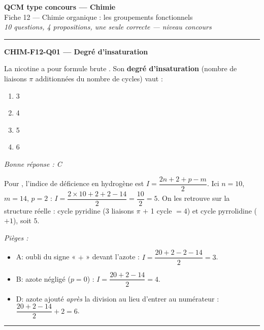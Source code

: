 \documentclass[11pt,a4paper]{article}
\begin{document}
\begin{center}
{\Large\bfseries QCM type concours --- Chimie}\\[2pt]
{\large Fiche 12 --- Chimie organique : les groupements fonctionnels}\\[2pt]
{\itshape 10 questions, 4 propositions, une seule correcte --- niveau concours}
\end{center}
\vspace{6pt}\hrule\vspace{10pt}

\noindent\textbf{CHIM-F12-Q01 --- Degré d'insaturation}\par
La nicotine a pour formule brute . Son \textbf{degré d'insaturation} (nombre de liaisons $\pi$ additionnées du nombre de cycles) vaut :
\begin{enumerate}[label=\Alph*)]
\item \num{3}
\item \num{4}
\item \num{5}
\item \num{6}
\end{enumerate}
\textit{Bonne réponse : C}\par
Pour , l'indice de déficience en hydrogène est $I=\dfrac{2n+2+p-m}{2}$. Ici $n=10$, $m=14$, $p=2$ : $I=\dfrac{2\times10+2+2-14}{2}=\dfrac{10}{2}=5$. On les retrouve sur la structure réelle : cycle pyridine (3 liaisons $\pi$ $+$ 1 cycle $=4$) et cycle pyrrolidine ($+1$), soit $5$.\par
\textit{Pièges :}
\begin{itemize}
\item A: oubli du signe « $+$ » devant l'azote : $I=\dfrac{20+2-2-14}{2}=3$.
\item B: azote négligé ($p=0$) : $I=\dfrac{20+2-14}{2}=4$.
\item D: azote ajouté \emph{après} la division au lieu d'entrer au numérateur : $\dfrac{20+2-14}{2}+2=6$.
\end{itemize}
\vspace{8pt}\hrule\vspace{8pt}
\end{document}
